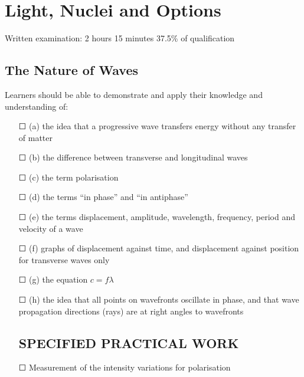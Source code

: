 \section{Light, Nuclei and Options}
Written examination: 2 hours 15 minutes
37.5\% of qualification
\subsection{The Nature of Waves}Learners should be able to demonstrate and apply their knowledge and
understanding of:
\begin{itemize}
	\item[\Large{$\Square$}] (a) the idea that a progressive wave transfers energy without any transfer of
	matter
	\item[\Large{$\Square$}]		(b) the difference between transverse and longitudinal waves
	\item[\Large{$\Square$}]		(c) the term polarisation
	\item[\Large{$\Square$}]		(d) the terms ``in phase'' and ``in antiphase''
	\item[\Large{$\Square$}]		(e) the terms \sq displacement, \sq amplitude, \sq wavelength, \sq frequency, \sq period and \sq velocity of a wave
	\item[\Large{$\Square$}]		(f) graphs of \sq displacement against time, and \sq displacement against position for transverse waves only
	\item[\Large{$\Square$}]		(g) the equation $c = f\lambda$
	\item[\Large{$\Square$}]		(h) the idea that all points on wavefronts oscillate in phase, and that \sq wave propagation directions (rays) are at right angles to wavefronts
	\subsection*{SPECIFIED PRACTICAL WORK}
	\item[\Large{$\Square$}] Measurement of the intensity variations for polarisation
\end{itemize}
